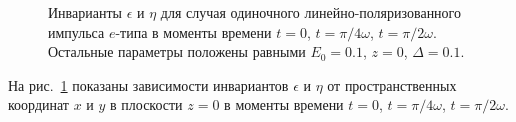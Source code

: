 \begin{figure}[pH]
\begin{minipage}[h]{0.47\linewidth}
\end{minipage}
\vfill
\begin{minipage}[h]{0.47\linewidth}
\end{minipage}
\hfill
\begin{minipage}[h]{0.47\linewidth}
\end{minipage}
\caption{\footnotesize Инварианты $\epsilon$ и $\eta$ для случая
одиночного линейно-поляризованного импульса $e$-типа в моменты
времени $t=0$, $t=\pi/4\omega$, $t=\pi/2\omega$. Остальные параметры
положены равными $E_0=0.1$, $z=0$, $\Delta=0.1$.} \label{EHinvs}   %
\end{figure}

На рис.~\ref{EHinvs} показаны зависимости инвариантов $\epsilon$ и
$\eta$ от пространственных координат $x$ и $y$ в плоскости $z=0$ в
моменты времени $t=0$, $t=\pi/4\omega$, $t=\pi/2\omega$.
